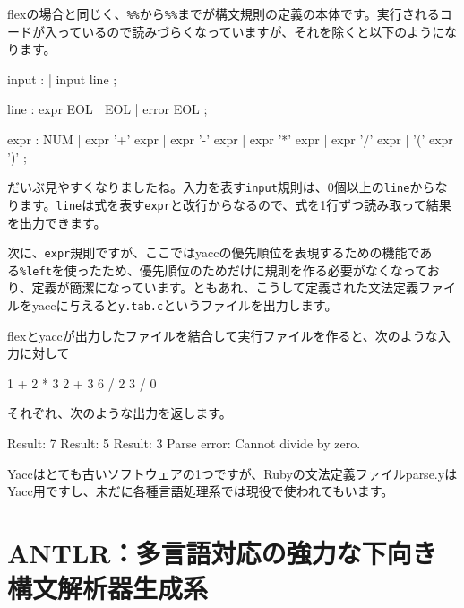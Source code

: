 flexの場合と同じく、\texttt{\%\%}から\texttt{\%\%}までが構文規則の定義の本体です。実行されるコードが入っているので読みづらくなっていますが、それを除くと以下のようになります。

\begin{codescreen}{}

  input :
        | input line
        ;

  line  : expr EOL
        | EOL
        | error EOL
        ;

  expr  : NUM
        | expr '+' expr
        | expr '-' expr
        | expr '*' expr
        | expr '/' expr
        | '(' expr ')'
        ;
\end{codescreen}

だいぶ見やすくなりましたね。入力を表す\texttt{input}規則は、0個以上の\texttt{line}からなります。\texttt{line}は式を表す\texttt{expr}と改行からなるので、式を1行ずつ読み取って結果を出力できます。

次に、\texttt{expr}規則ですが、ここではyaccの優先順位を表現するための機能である\texttt{\%left}を使ったため、優先順位のためだけに規則を作る必要がなくなっており、定義が簡潔になっています。ともあれ、こうして定義された文法定義ファイルをyaccに与えると\texttt{y.tab.c}というファイルを出力します。

flexとyaccが出力したファイルを結合して実行ファイルを作ると、次のような入力に対して

\begin{codescreen}{}
1 + 2 * 3
2 + 3
6 / 2
3 / 0
\end{codescreen}

それぞれ、次のような出力を返します。

\begin{codescreen}{}
Result: 7
Result: 5
Result: 3
Parse error: Cannot divide by zero.
\end{codescreen}

Yaccはとても古いソフトウェアの1つですが、Rubyの文法定義ファイルparse.yはYacc用ですし、未だに各種言語処理系では現役で使われてもいます。

\section{ANTLR：多言語対応の強力な下向き構文解析器生成系}

